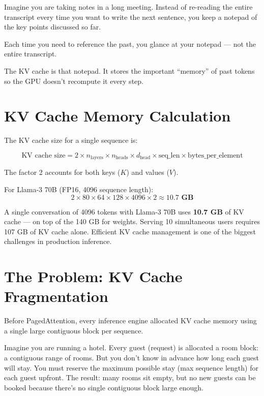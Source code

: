 \documentclass[11pt, twoside, openright]{book}
\newcommand{\warnbox}[2]{\begin{tcolorbox}[warnstyle, title={#1}]#2\end{tcolorbox}}
\newcommand{\analogybox}[2]{\begin{tcolorbox}[analogystyle, title={Analogy: #1}]#2\end{tcolorbox}}
\begin{document}
\analogybox{The Meeting Notes}{
Imagine you are taking notes in a long meeting.  Instead of re-reading the entire
transcript every time you want to write the next sentence, you keep a notepad of
the key points discussed so far.

Each time you need to reference the past, you glance at your notepad --- not the
entire transcript.

The KV cache is that notepad.  It stores the important ``memory'' of past tokens so
the GPU doesn't recompute it every step.
}

\section{KV Cache Memory Calculation}

The KV cache size for a single sequence is:

\[
  \text{KV cache size} = 2 \times n_\text{layers} \times n_\text{heads} \times
  d_\text{head} \times \text{seq\_len} \times \text{bytes\_per\_element}
\]

The factor 2 accounts for both keys ($K$) and values ($V$).

For Llama-3 70B (FP16, 4096 sequence length):
\[
  2 \times 80 \times 64 \times 128 \times 4096 \times 2 \approx \mathbf{10.7\text{ GB}}
\]

\warnbox{Memory Shock}{
A single conversation of 4096 tokens with Llama-3 70B uses \textbf{10.7 GB} of KV
cache --- on top of the 140 GB for weights.  Serving 10 simultaneous users requires
107 GB of KV cache alone.  Efficient KV cache management is one of the biggest
challenges in production inference.
}

\section{The Problem: KV Cache Fragmentation}

Before PagedAttention, every inference engine allocated KV cache memory using
a single large contiguous block per sequence.

Imagine you are running a hotel.  Every guest (request) is allocated a room block:
a contiguous range of rooms.  But you don't know in advance how long each guest
will stay.  You must reserve the maximum possible stay (max sequence length) for
each guest upfront.  The result: many rooms sit empty, but no new guests can be
booked because there's no single contiguous block large enough.
\end{document}
